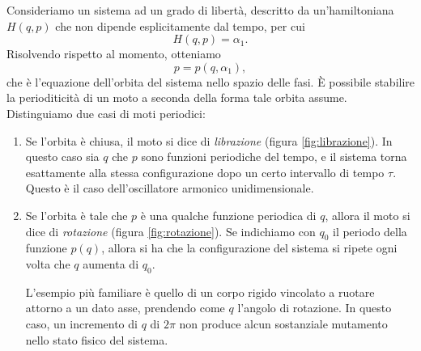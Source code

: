 Consideriamo un sistema ad un grado di libertà, descritto da un'hamiltoniana $H(q,p)$ che non dipende esplicitamente dal tempo, per cui
\begin{equation} \label{eq:hamilton-jacobi-1d}
    H\left( q, p \right) = \alpha_1. 
\end{equation}
Risolvendo rispetto al momento, otteniamo 
\begin{equation} \label{eq:orbita-1d}
    p = p(q, \alpha_1),
\end{equation}
che è l'equazione dell'orbita del sistema nello spazio delle fasi. È possibile stabilire la perioditicità di un moto a seconda della forma tale orbita assume. Distinguiamo due casi di moti periodici:
\begin{enumerate}
    \item Se l'orbita è chiusa, il moto si dice di \emph{librazione} (figura \ref{fig:librazione}). In questo caso sia $q$ che $p$ sono funzioni periodiche del tempo, e il sistema torna esattamente alla stessa configurazione dopo un certo intervallo di tempo $\tau$. Questo è il caso dell'oscillatore armonico unidimensionale.
    \item Se l'orbita è tale che $p$ è una qualche funzione periodica di $q$, allora il moto si dice di \emph{rotazione} (figura \ref{fig:rotazione}). Se indichiamo con $q_0$ il periodo della funzione $p(q)$, allora si ha che la configurazione del sistema si ripete ogni volta che $q$ aumenta di $q_0$. \par L'esempio più familiare è quello di un corpo rigido vincolato a ruotare attorno a un dato asse, prendendo come $q$ l'angolo di rotazione. In questo caso, un incremento di $q$ di $2\pi$ non produce alcun sostanziale mutamento nello stato fisico del sistema.
\end{enumerate}

